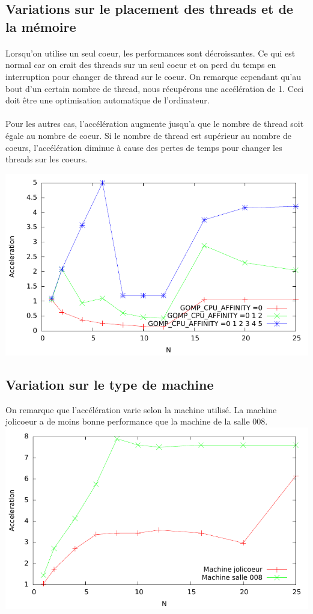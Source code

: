\documentclass[a4paper,11pt]{report}
\begin{document}
\subsection{Variations sur le placement des threads et de la mémoire}
\paragraph{}
Lorsqu'on utilise un seul coeur, les performances sont décroissantes. Ce qui est normal car on crait des threads sur un seul coeur et on perd du temps en interruption pour changer de thread sur le coeur. On remarque cependant qu'au bout d'un certain nombre de thread, nous récupérons une accélération de 1. Ceci doit être une optimisation automatique de l'ordinateur. 

\paragraph{}
Pour les autres cas, l'accélération augmente jusqu'a que le nombre de thread soit égale au nombre de coeur. Si le nombre de thread est supérieur au nombre de coeurs, l'accélération diminue à cause des pertes de temps pour changer les threads sur les coeurs.

\includegraphics{Courbe/GOMP.pdf}
\subsection{Variation sur le type de machine}
On remarque que l'accélération varie selon la machine utilisé. La machine jolicoeur a de moins bonne performance que la machine de la salle 008.\\

\includegraphics{Courbe/Difference_machine.pdf}
\end{document}
